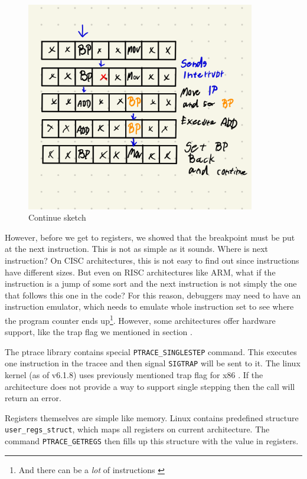 \begin{figure}\label{fig:continue}
    \centering
    \includegraphics[width=100mm,scale=0.5]{media/breakpoint_tbd}
    \caption{Continue sketch}
\end{figure}

However, before we get to registers, we showed that the breakpoint must be put
at the next instruction. This is not as simple as it sounds. Where is next
instruction? On CISC architectures, this is not easy to find out since
instructions have different sizes. But even on RISC architectures like ARM,
what if the instruction is a jump of some sort and the next instruction is not
simply the one that follows this one in the code? For this reason, debuggers may
need to have an instruction emulator, which needs to emulate whole instruction
set to see where the program counter ends up\footnote{And there can be a
\textit{lot} of instructions \cite{intel-manual}}. However, some architectures
offer hardware support, like the trap flag we mentioned in section .

The ptrace library contains special \texttt{PTRACE\_SINGLESTEP} command. This
executes one instruction in the tracee and then signal \texttt{SIGTRAP} will be
sent to it. The linux kernel (as of v6.1.8) uses previously mentioned trap flag
for x86 \cite{linuxkernel-trapflag}. If the architecture does not provide a way
to support single stepping then the call will return an error.

Registers themselves are simple like memory. Linux contains predefined structure
\texttt{user\_regs\_struct}, which maps all registers on current architecture.
The command \texttt{PTRACE\_GETREGS} then fills up this structure with the
value in registers.



